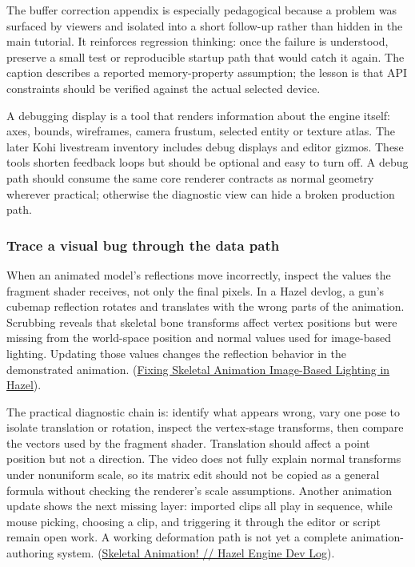 The buffer correction appendix is especially pedagogical because a problem was surfaced by viewers and isolated into a short follow-up rather than hidden in the main tutorial. It reinforces regression thinking: once the failure is understood, preserve a small test or reproducible startup path that would catch it again. The caption describes a reported memory-property assumption; the lesson is that API constraints should be verified against the actual selected device.

A debugging display is a tool that renders information about the engine itself: axes, bounds, wireframes, camera frustum, selected entity or texture atlas. The later Kohi livestream inventory includes debug displays and editor gizmos. These tools shorten feedback loops but should be optional and easy to turn off. A debug path should consume the same core renderer contracts as normal geometry wherever practical; otherwise the diagnostic view can hide a broken production path.

\subsubsection{Trace a visual bug through the data path}\label{06-engine-ii-ch041-trace-a-visual-bug-through-the-data-path}

\hypertarget{06-engine-ii-ch041-trace-a-visual-bug-through-the-data-path}{}

When an animated model's reflections move incorrectly, inspect the values the fragment shader receives, not only the final pixels. In a Hazel devlog, a gun's cubemap reflection rotates and translates with the wrong parts of the animation. Scrubbing reveals that skeletal bone transforms affect vertex positions but were missing from the world-space position and normal values used for image-based lighting. Updating those values changes the reflection behavior in the demonstrated animation. (\href{https://www.youtube.com/watch?v=fs9ChRr4VHM&t=4m18s}{Fixing Skeletal Animation Image-Based Lighting in Hazel}).

The practical diagnostic chain is: identify what appears wrong, vary one pose to isolate translation or rotation, inspect the vertex-stage transforms, then compare the vectors used by the fragment shader. Translation should affect a point position but not a direction. The video does not fully explain normal transforms under nonuniform scale, so its matrix edit should not be copied as a general formula without checking the renderer's scale assumptions. Another animation update shows the next missing layer: imported clips all play in sequence, while mouse picking, choosing a clip, and triggering it through the editor or script remain open work. A working deformation path is not yet a complete animation-authoring system. (\href{https://www.youtube.com/watch?v=8-wAi--vW1o&t=4m18s}{Skeletal Animation! // Hazel Engine Dev Log}).

